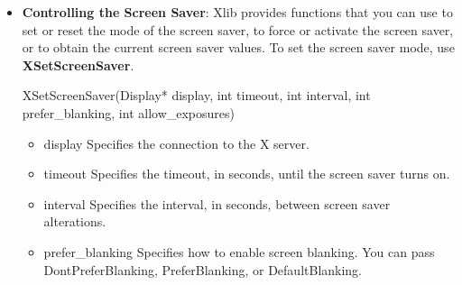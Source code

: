 \documentclass{report}
\begin{document}
\begin{itemize}
            \bigbreak \noindent 
            \begin{cppcode}
                XKillClient(Display* display, XID resource)
            \end{cppcode}
            \begin{itemize}
                \item display Specifies the connection to the X server.
                \item resource Specifies any resource associated with the client that you want to destroy or AllTemporary
            \end{itemize}
            The XKillClient function forces a close down of the client that created the resource if a valid resource is specified. If the client has already terminated in either RetainPermanent or RetainTemporary mode, all of the client’s resources are destroyed. If AllTemporary is specified, the resources of all clients that have terminated in RetainTemporary are destroyed. This permits implementation of window manager facilities that aid debugging. A client can set its close-down mode to RetainTemporary. If the client then crashes, its windows would not be destroyed. The programmer can then inspect the application’s window tree and use the window manager to destroy the zombie windows
            \bigbreak \noindent 
            XKillClient can generate a BadValue error.
        \item \textbf{Controlling the Screen Saver}: Xlib provides functions that you can use to set or reset the mode of the screen saver, to force or activate the screen saver, or to obtain the current screen saver values.
            \bigbreak \noindent 
            To set the screen saver mode, use \textbf{XSetScreenSaver}.
            \bigbreak \noindent 
            \begin{cppcode}
            XSetScreenSaver(Display* display, int timeout, int interval, int prefer_blanking, int allow_exposures)
            \end{cppcode}
            \begin{itemize}
                \item display Specifies the connection to the X server.
                \item timeout Specifies the timeout, in seconds, until the screen saver turns on.
                \item interval Specifies the interval, in seconds, between screen saver alterations.
                \item prefer\_blanking Specifies how to enable screen blanking. You can pass DontPreferBlanking, PreferBlanking, or DefaultBlanking.

\end{itemize}
\end{itemize}
\end{document}
